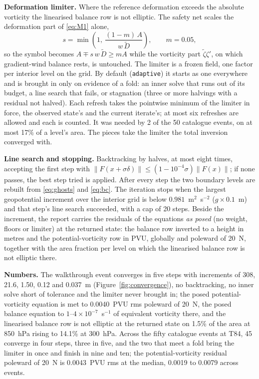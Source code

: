 \documentclass[11pt,a4paper]{article}
\newcommand{\code}[1]{\texttt{#1}}
\begin{document}
\textbf{Deformation limiter.} Where the reference deformation exceeds the
absolute vorticity the linearised balance row is not elliptic. The safety net
scales the deformation part of \eqref{eq:M1} alone,
\begin{equation}
s = \min\!\left(1,\ \frac{(1-m)\,A}{w\,\tilde D}\right),
\qquad m = 0.05 ,
\label{eq:limiter}
\end{equation}
so the symbol becomes $A\mp s\,w\,\tilde D\ge mA$ while the vorticity part
$\tilde\zeta\zeta'$, on which gradient-wind balance rests, is untouched. The
limiter is a frozen field, one factor per interior level on the grid. By
default (\code{adaptive}) it starts as one everywhere and is brought in only on
evidence of a fold: an inner solve that runs out of its budget, a line search
that fails, or stagnation (three or more halvings with a residual not halved).
Each refresh takes the pointwise minimum of the limiter in force, the observed
state's and the current iterate's; at most six refreshes are allowed and each
is counted. It was needed by 2 of the 50 catalogue events, on at most 17\% of
a level's area. The pieces take the limiter the total inversion converged with.

\textbf{Line search and stopping.} Backtracking by halves, at most eight
times, accepting the first step with
$\|F(x+\sigma\delta)\|\le(1-10^{-4}\sigma)\|F(x)\|$; if none passes, the best
step tried is applied. After every step the two boundary levels are rebuilt
from \eqref{eq:ghosts} and \eqref{eq:bc}. The iteration stops when the largest
geopotential increment over the interior grid is below $0.981$~m$^2$~s$^{-2}$
($g\times0.1$~m) and that step's line search succeeded, with a cap of 20
steps. Beside the increment, the report carries the residuals of the equations
\emph{as posed} (no weight, floors or limiter) at the returned state: the
balance row inverted to a height in metres and the potential-vorticity row in
PVU, globally and poleward of 20~N, together with the area fraction per level
on which the linearised balance row is not elliptic there.

\textbf{Numbers.} The walkthrough event converges in five steps with
increments of 308, 21.6, 1.50, 0.12 and 0.037~m (Figure~\ref{fig:convergence}),
no backtracking, no inner solve short of tolerance and the limiter never
brought in; the posed potential-vorticity equation is met to 0.0040~PVU rms
poleward of 20~N, the posed balance equation to $1$--$4\times10^{-7}$~s$^{-1}$
of equivalent vorticity there, and the linearised balance row is not elliptic
at the returned state on 1.5\% of the area at 850~hPa rising to 14.1\% at
300~hPa. Across the fifty catalogue events at T84, 45 converge in four steps,
three in five, and the two that meet a fold bring the limiter in once and
finish in nine and ten; the potential-vorticity residual poleward of 20~N is
0.0043~PVU rms at the median, 0.0019 to 0.0079 across events.
\end{document}
